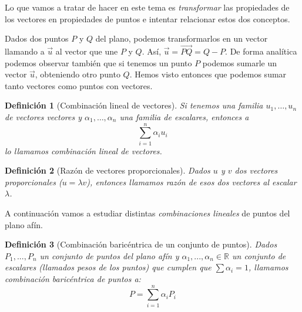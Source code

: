 \documentclass[11pt, a4paper, titlepage]{article}
\newcommand{\R}{\mathbb{R}}
\renewcommand{\vec}{\overrightarrow}
\theoremstyle{theorem-style}
\theoremstyle{definition-style}
\newtheorem*{ndef}{Definición}
\theoremstyle{remark-style}
\theoremstyle{example-style}
\begin{document}
\begin{figure*}[h]
  \centering
  \caption{El punto (2,3) en el plano}
\end{figure*}

Lo que vamos a tratar de hacer en este tema es \textit{transformar} las propiedades de los vectores en propiedades de puntos e intentar relacionar estos dos conceptos.

Dados dos puntos $P$ y $Q$ del plano, podemos transformarlos en un vector llamando a $\vec{u}$ al vector que une $P$ y $Q$. Así, $\vec{u} = \overrightarrow{PQ} = Q-P$. De forma analítica podemos observar también que si tenemos un punto $P$ podemos sumarle un vector $\vec{u}$, obteniendo otro punto $Q$. Hemos visto entonces que podemos sumar tanto vectores como puntos con vectores.


\begin{ndef}[Combinación lineal de vectores]
  Si tenemos una familia $u_1,\ldots , u_n$ de vectores vectores y $\alpha_1,\ldots, \alpha_n$ una familia de escalares, entonces a
  \[
    \sum_{i=1}^n \alpha_i u_i
  \]
  lo llamamos \textit{combinación lineal de vectores}.
\end{ndef}

\begin{ndef}[Razón de vectores proporcionales]
  Dados $u$ y $v$ dos vectores proporcionales ($u = \lambda v$), entonces llamamos \textit{razón} de esos dos vectores al escalar $\lambda$.
\end{ndef}

A continuación vamos a estudiar distintas \textit{combinaciones lineales} de puntos del plano afín.

\begin{ndef}[Combinación baricéntrica de un conjunto de puntos]
  Dados $P_1,...,P_n$ un conjunto de puntos del plano afín y $\alpha_1,...,\alpha_n \in \R$ un conjunto de escalares (llamados \textit{pesos} de los puntos) que cumplen que $\sum \alpha_i = 1$, llamamos \textit{combinación baricéntrica de puntos} a:
  \[
    P = \sum_{i=1}^n \alpha_i P_i
  \]
\end{ndef}
\end{document}
